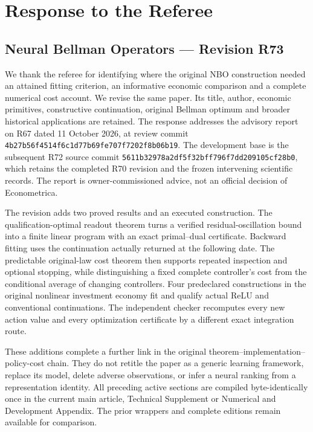 \hypertarget{response-to-the-referee}{%
\section{Response to the Referee}\label{response-to-the-referee}}

\hypertarget{neural-bellman-operators-revision-r73}{%
\subsection{Neural Bellman Operators --- Revision
R73}\label{neural-bellman-operators-revision-r73}}

We thank the referee for identifying where the original NBO construction
needed an attained fitting criterion, an informative economic comparison
and a complete numerical cost account. We revise the same paper. Its
title, author, economic primitives, constructive continuation, original
Bellman optimum and broader historical applications are retained. The
response addresses the advisory report on R67 dated 11 October 2026, at
review commit \texttt{4b27b56f4514f6c1d77b69fe707f7202f8b06b19}. The
development base is the subsequent R72 source commit
\texttt{5611b32978a2df5f32bff796f7dd209105cf28b0}, which retains the
completed R70 revision and the frozen intervening scientific records.
The report is owner-commissioned advice, not an official decision of
Econometrica.

The revision adds two proved results and an executed construction. The
qualification-optimal readout theorem turns a verified
residual-oscillation bound into a finite linear program with an exact
primal--dual certificate. Backward fitting uses the continuation
actually returned at the following date. The predictable original-law
cost theorem then supports repeated inspection and optional stopping,
while distinguishing a fixed complete controller's cost from the
conditional average of changing controllers. Four predeclared
constructions in the original nonlinear investment economy fit and
qualify actual ReLU and conventional continuations. The independent
checker recomputes every new action value and every optimization
certificate by a different exact integration route.

These additions complete a further link in the original
theorem--implementation--policy-cost chain. They do not retitle the
paper as a generic learning framework, replace its model, delete adverse
observations, or infer a neural ranking from a representation identity.
All preceding active sections are compiled byte-identically once in the
current main article, Technical Supplement or Numerical and Development
Appendix. The prior wrappers and complete editions remain available for
comparison.

